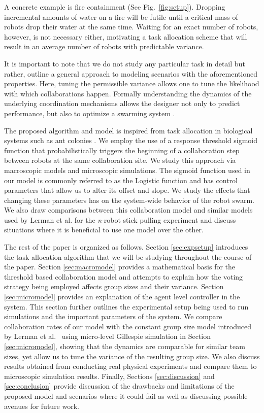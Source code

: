 \documentclass{svmult}  %
\begin{document}
A concrete example is fire containment (See Fig.~\ref{fig:setup}). Dropping incremental amounts of water on a fire will be futile until a critical mass of robots drop their water at the same time. Waiting for an exact number of robots, however, is not necessary either, motivating a task allocation scheme that will result in an average number of robots with predictable variance. 

It is important to note that we do not study any particular task in detail but rather, outline a general approach to modeling scenarios with the aforementioned properties. Here, tuning the permissible variance allows one to tune the likelihood with which collaborations happen. Formally understanding the dynamics of the underlying coordination mechanisms allows the designer not only to predict performance, but also to optimize a swarming system \cite{Correll2008}.  

The proposed algorithm and model is inspired from task allocation in biological systems such as ant colonies \cite{Bonabeau1999,Krieger2000}. We employ the use of a response threshold sigmoid function that probabilistically triggers the beginning of a collaboration step between robots at the same collaboration site. We study this approach via macroscopic models and microscopic simulations. The sigmoid function used in our model is commonly referred to as the Logistic function and has control parameters that allow us to alter its offset and slope. We study the effects that changing these parameters has on the system-wide behavior of the robot swarm. We also draw comparisons between this collaboration model and similar models used by Lerman et al. for the \emph{n}-robot stick pulling experiment \cite{Lerman2001} and discuss situations where it is beneficial to use one model over the other.

The rest of the paper is organized as follows. Section \ref{sec:expsetup} introduces the task allocation algorithm that we will be studying throughout the course of the paper.
Section \ref{sec:macromodel} provides a mathematical basis for the threshold based collaboration model and attempts to explain how the voting strategy being employed affects group sizes and their variance.
Section \ref{sec:micromodel} provides an explanation of the agent level controller in the system. This section further outlines the experimental setup being used to run simulations and the important parameters of the system. 
We compare collaboration rates of our model with the constant group size model introduced by Lerman et al.~\cite{Lerman2001} using micro-level Gillespie simulation in Section \ref{sec:micromodel}, showing that the dynamics are comparable for similar team sizes, yet allow us to tune the variance of the resulting group size. We also discuss results obtained from conducting real physical experiments and compare them to microscopic simulation results. Finally, Sections \ref{sec:discussion} and \ref{sec:conclusion} provide discussion of the drawbacks and limitations of the proposed model and scenarios where it could fail as well as discussing possible avenues for future work.
\end{document}
